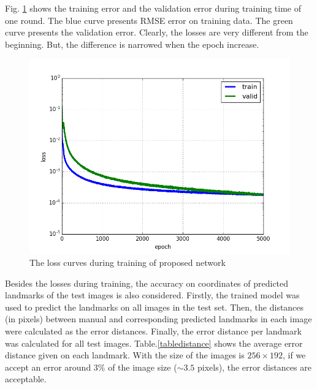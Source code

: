 \documentclass[10pt]{article}
\begin{document}
Fig. \ref{cnnlosses} shows the training error and the validation error during training time of one round. The blue curve presents RMSE error on training data. The green curve presents the validation error. Clearly, the losses are very different from the beginning. But, the difference is narrowed when the epoch increase.

\begin{figure}[htbp]
\centering
\includegraphics[scale=0.417]{images/losses}
\caption{The loss curves during training of proposed network} 
\label{cnnlosses}
\end{figure}

Besides the losses during training, the accuracy on coordinates of predicted landmarks of the test images is also considered. Firstly, the trained model was used to predict the landmarks on all images in the test set. Then, the distances (in pixels) between manual and corresponding predicted landmarks in each image were calculated as the error distances. Finally, the error distance per landmark was calculated for all test images. Table.\ref{tabledistance} shows the average error distance given on each landmark. With the size of the images is $256 \times 192$, if we accept an error around $3\%$ of the image size ($ \sim3.5$ pixels), the error distances are acceptable.
\end{document}
